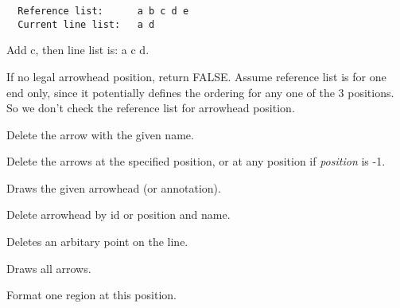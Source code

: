 \begin{verbatim}
  Reference list:      a b c d e
  Current line list:   a d
\end{verbatim}

Add c, then line list is: a c d.

If no legal arrowhead position, return FALSE.  Assume reference list is
for one end only, since it potentially defines the ordering for any one
of the 3 positions. So we don't check the reference list for arrowhead
position.



Delete the arrow with the given name.



Delete the arrows at the specified position, or at any position if {\it position} is -1.



Draws the given arrowhead (or annotation).




Delete arrowhead by id or position and name.



Deletes an arbitary point on the line.



Draws all arrows.



Format one region at this position.

